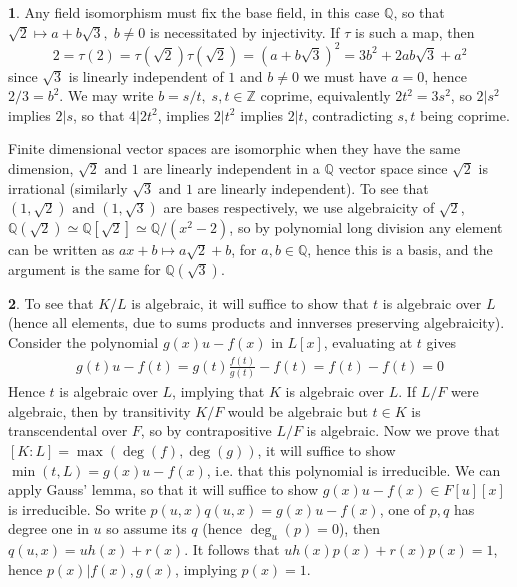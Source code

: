 \documentclass[11pt]{article}
\theoremstyle{definition}
\newtheorem{pb}{}
\newcommand{\tand}{\text{ and }}
\begin{document}
    \begin{pb}
        Any field isomorphism must fix the base field, in this case \(\mathbb{Q}\), so that \(\sqrt{2} \mapsto a + b\sqrt3, \; b \neq 0\) is necessitated by injectivity.
        If \(\tau\) is such a map, then 
        \[2 = \tau(2) = \tau(\sqrt2)\tau(\sqrt2) = (a+b\sqrt3)^2 = 3b^2 + 2ab\sqrt3 + a^2\]
        since \(\sqrt3\) is linearly independent of \(1\) and \(b \neq 0\) we must have \(a = 0\), hence \(2/3 = b^2\). We may write 
        \(b = s/t, \; s,t \in \mathbb{Z}\) coprime, equivalently \(2t^2 = 3s^2\), so \(2 \vert s^2\) implies \(2 \vert s\), so that \(4 \vert 2t^2\), implies
        \(2 \vert t^2\) implies \(2 \vert t\), contradicting \(s,t \) being coprime.

        Finite dimensional vector spaces are isomorphic when they have the same dimension, \(\sqrt2 \tand 1\) are linearly independent in a \(\mathbb{Q}\)
        vector space since \(\sqrt2\) is irrational (similarly \(\sqrt3 \tand 1\) are linearly independent). To see that \((1,\sqrt2) \tand (1,\sqrt3)\) are bases respectively,
        we use algebraicity of \(\sqrt2\), \(\mathbb{Q}(\sqrt2) \simeq \mathbb{Q}[\sqrt2] \simeq \mathbb{Q}/(x^2-2)\), so by polynomial long division any element can be written
        as \(ax + b \mapsto a\sqrt2 + b\), for \(a,b \in \mathbb{Q}\), hence this is a basis, and the argument is the same for \(\mathbb{Q}(\sqrt3)\).
    \end{pb}
    \begin{pb}
        To see that \(K/L\) is algebraic, it will suffice to show that \(t\) is algebraic over \(L\) (hence all elements, due to sums products and innverses preserving algebraicity).
        Consider the polynomial \(g(x)u - f(x)\) in \(L[x]\), evaluating at \(t\) gives
        \begin{align*}
            g(t)u - f(t) = g(t)\frac{f(t)}{g(t )} - f(t) = f(t) - f(t) = 0
        \end{align*}
        Hence \(t\) is algebraic over \(L\), implying that \(K\) is algebraic over \(L\). If \(L/F \) were algebraic, then by transitivity \(K/F\) would be algebraic
        but \(t \in K \) is  transcendental over \(F\), so by contrapositive \(L/F \) is algebraic. Now we prove that \([K:L] = \max(\deg(f),\deg(g))\), it will suffice to show
        \(\min(t,L) = g(x)u - f(x)\), i.e. that this polynomial is irreducible. We can apply Gauss' lemma, so that it will suffice to show \(g(x)u - f(x) \in F[u][x]\) is irreducible.
        So write \(p(u,x)q(u,x) = g(x)u - f(x)\), one of \(p,q\) has degree one in \(u\) so assume its \(q\) (hence \(\deg_u(p)=0\)), then \(q(u,x) = uh(x) + r(x)\). It follows that
        \(uh(x)p(x) + r(x)p(x) = 1\), hence \(p(x) \vert f(x),g(x)\), implying \(p(x) = 1\).
    \end{pb}
\end{document}
